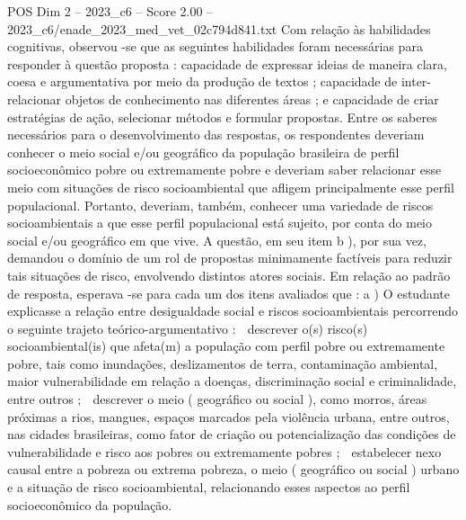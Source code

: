\begin{textsample}{POS Dim 2 – 2023\_c6 – Score 2.00 – 2023\_c6/enade\_2023\_med\_vet\_02c794d841.txt}
Com relação às habilidades cognitivas, observou -se que as seguintes habilidades foram necessárias para responder à questão proposta : capacidade de expressar ideias de maneira clara, coesa e argumentativa por meio da produção de textos ; capacidade de inter-relacionar objetos de conhecimento nas diferentes áreas ; e capacidade de criar estratégias de ação, selecionar métodos e formular propostas.
Entre os saberes necessários para o desenvolvimento das respostas, os respondentes deveriam conhecer o meio social e/ou geográfico da população brasileira de perfil socioeconômico pobre ou extremamente pobre e deveriam saber relacionar esse meio com situações de risco socioambiental que afligem principalmente esse perfil populacional.
Portanto, deveriam, também, conhecer uma variedade de riscos socioambientais a que esse perfil populacional está sujeito, por conta do meio social e/ou geográfico em que vive.
A questão, em seu item b ), por sua vez, demandou o domínio de um rol de propostas minimamente factíveis para reduzir tais situações de risco, envolvendo distintos atores sociais.
Em relação ao padrão de resposta, esperava -se para cada um dos itens avaliados que : a ) O estudante explicasse a relação entre desigualdade social e riscos socioambientais percorrendo o seguinte trajeto teórico-argumentativo :  descrever o(s) risco(s) socioambiental(is) que afeta(m) a população com perfil pobre ou extremamente pobre, tais como inundações, deslizamentos de terra, contaminação ambiental, maior vulnerabilidade em relação a doenças, discriminação social e criminalidade, entre outros ;  descrever o meio ( geográfico ou social ), como morros, áreas próximas a rios, mangues, espaços marcados pela violência urbana, entre outros, nas cidades brasileiras, como fator de criação ou potencialização das condições de vulnerabilidade e risco aos pobres ou extremamente pobres ;  estabelecer nexo causal entre a pobreza ou extrema pobreza, o meio ( geográfico ou social ) urbano e a situação de risco socioambiental, relacionando esses aspectos ao perfil socioeconômico da população.

\end{textsample}
